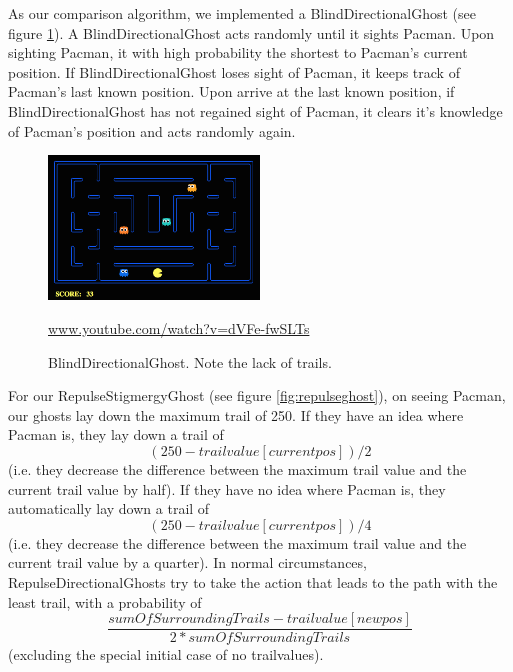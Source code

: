 \documentclass[11pt]{article}
\begin{document}
As our comparison algorithm, we implemented a BlindDirectionalGhost (see figure \ref{fig:blindghost}). A BlindDirectionalGhost acts randomly until it sights Pacman.  Upon sighting Pacman, it with high probability the shortest to Pacman's current position.  If BlindDirectionalGhost loses sight of Pacman, it keeps track of Pacman's last known position.  Upon arrive at the last known position, if BlindDirectionalGhost has not regained sight of Pacman, it clears it's knowledge of Pacman's position and acts randomly again.
\begin{figure}[H]
	\includegraphics[width=0.5\textwidth]{BlindDirectionalGhost.png}
	\caption{BlindDirectionalGhost. Note the lack of trails.}
 	\protect\url{www.youtube.com/watch?v=dVFe-fwSLTs} 
	\label{fig:blindghost}
\end{figure}

For our RepulseStigmergyGhost  (see figure \ref{fig:repulseghost}), on seeing Pacman, our ghosts lay down the maximum trail of 250.  If they have an idea where Pacman is, they lay down a trail of $$(250 - trailvalue[currentpos]) / 2$$ (i.e. they decrease the difference between the maximum trail value and the current trail value by half).   If they have no idea where Pacman is, they automatically lay down a trail of $$(250 - trailvalue[currentpos]) / 4$$ (i.e. they decrease the difference between the maximum trail value and the current trail value by a quarter). In normal circumstances, RepulseDirectionalGhosts try to take the action that leads to the path with the least trail, with a probability of $$\frac{sumOfSurroundingTrails - trailvalue[newpos]}{2 * sumOfSurroundingTrails}$$ (excluding the special initial case of no trailvalues).
\end{document}
